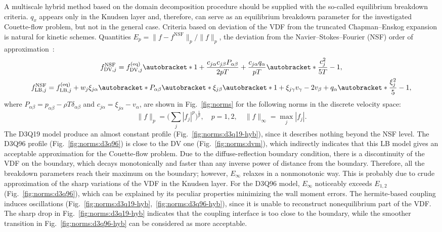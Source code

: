 \documentclass[]{elsarticle} %
\DeclarePairedDelimiter\autobracket()       %
\newcommand{\br}[1]{\autobracket*{#1}}
\newcommand{\equil}[1]{#1^\mathrm{(eq)}}
\newcommand{\LB}{\mathrm{LB}}
\newcommand{\DV}{\mathrm{DV}}
\newcommand{\xiai}{\xi_{j \alpha}}
\newcommand{\xiaj}{\xi_{j \beta}}
\newcommand{\xiak}{\xi_{j \gamma}}
\newcommand{\cai}{c_{j \alpha}}
\newcommand{\caj}{c_{j \beta}}
\begin{document}
A multiscale hybrid method based on the domain decomposition procedure should be supplied with the so-called equilibrium breakdown criteria.
\(q_x\) appears only in the Knudsen layer and, therefore, can serve as an equilibrium breakdown parameter
for the investigated Couette-flow problem, but not in the general case.
Criteria based on deviation of the VDF from the truncated Chapman--Enskog expansion is natural for kinetic schemes.
Quantities \(E_p=\|f-f^{\mathrm{NSF}}\|_p/\|f\|_p\), the deviation from the Navier--Stokes--Fourier (NSF) order of approximation~\cite{Zhang2014}:
\begin{gather}
    f^{\mathrm{NSF}}_{\DV,j} = \equil{f}_{\DV,j}\br{
        1 + \frac{\cai\caj P_{\alpha\beta}}{2pT} + \frac{\cai q_\alpha}{pT}\br{ \frac{c_j^2}{5T} - 1 } }, \label{eq:NSF_DV} \\
    f^{\mathrm{NSF}}_{\LB,j} = \equil{f}_{\LB,j} + w_j\xiai\br{
         P_{\alpha\beta}\br{\xiaj\br{1 + \xiak v_\gamma} - 2 v_\beta } + q_\alpha\br{ \frac{\xi_j^2}5 - 1 } }, \label{eq:NSF_LB}
\end{gather}
where \(P_{\alpha\beta} = p_{\alpha\beta} - \rho T\delta_{\alpha\beta}\) and \(\cai = \xiai - v_\alpha\),
are shown in Fig.~\ref{fig:norms} for the following norms in the discrete velocity space:
\begin{equation}\label{eq:norms}
    \|f\|_p = \bigg(\sum_j |f_j|^p \bigg)^\frac1p, \quad p=1,2, \quad \|f\|_\infty = \max_j |f_j|.
\end{equation}
The D3Q19 model produce an almost constant profile (Fig.~\ref{fig:norms:d3q19-hyb}),
since it describes nothing beyond the NSF level.
The D3Q96 profile (Fig.~\ref{fig:norms:d3q96}) is close to the DV one (Fig.~\ref{fig:norms:dvm}),
which indirectly indicates that this LB model gives an acceptable approximation for the Couette-flow problem.
Due to the diffuse-reflection boundary condition, there is a discontinuity of the VDF on the boundary,
which decays monotonically and faster than any inverse power of distance from the boundary.
Therefore, all the breakdown parameters reach their maximum on the boundary;
however, \(E_\infty\) relaxes in a nonmonotonic way.
This is probably due to crude approximation of the sharp variations of the VDF in the Knudsen layer.
For the D3Q96 model, \(E_\infty\) noticeably exceeds \(E_{1,2}\) (Fig.~\ref{fig:norms:d3q96}),
which can be explained by its peculiar properties minimizing the wall moment errors.
The hermite-based coupling induces oscillations (Fig.~\ref{fig:norms:d3q19-hyb},~\ref{fig:norms:d3q96-hyb}),
since it is unable to reconstruct nonequilibrium part of the VDF.
The sharp drop in Fig.~\ref{fig:norms:d3q19-hyb} indicates that the coupling interface is too close to the boundary,
while the smoother transition in Fig.~\ref{fig:norms:d3q96-hyb} can be considered as more acceptable.
\end{document}
